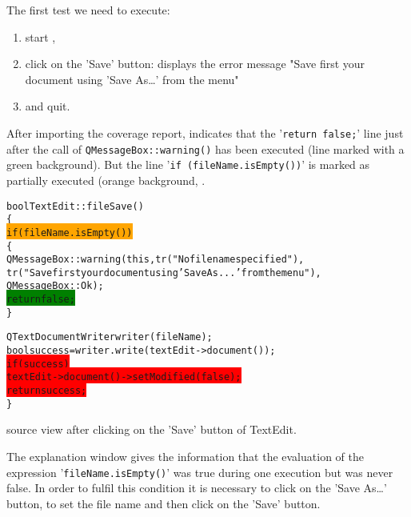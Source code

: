 The first test we need to execute:
\begin{enumerate}
  \item start {\TextEdit},
  \item click on the '\textsf{Save}' button: {\TextEdit} displays the error message "Save
    first your document using 'Save As\ldots' from the menu"
  \item and quit.
\end{enumerate}

After importing the coverage report, {\CoverageBrowser} indicates that the '\verb$return false;$'
line just after the call of \verb$QMessageBox::warning()$ has been executed (line
    marked with a green background). But the line '\verb$if (fileName.isEmpty())$' is
marked as partially executed (orange background, .

\begin{figureenv}
  \scriptsize
\begin{alltt}
bool TextEdit::fileSave()
\{
\colorbox{orange}{  if (fileName.isEmpty())}
  \{
    QMessageBox::warning(this,tr("No file name specified"),
      tr("Save first your document using 'Save As...' from the menu"),
      QMessageBox::Ok );
\colorbox{green}{    return false;}
   \}

  QTextDocumentWriter writer(fileName);
  bool success = writer.write(textEdit->document());
\colorbox{red}{  if (success)}
\colorbox{red}{     textEdit->document()->setModified(false);}
\colorbox{red}{  return success;}
\}
\end{alltt}
\caption{{\CoverageBrowser} source view  after clicking on the 'Save' button of TextEdit.}
\label{lst:src2}
\end{figureenv}

The explanation window  gives the information that the
evaluation of the expression '\verb$fileName.isEmpty()$' was true during one execution
but was never false. In order to fulfil this condition it is necessary to click
on  the '\textsf{Save As\ldots}' button,  to set the file name and then
click on the '\textsf{Save}' button.

